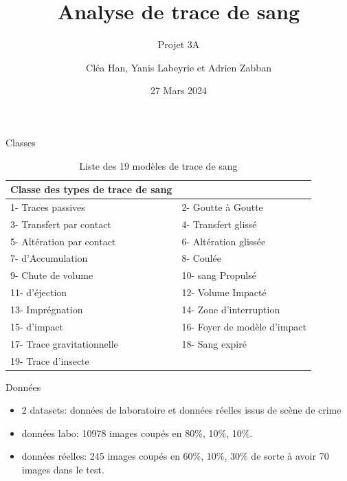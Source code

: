 \documentclass[11pt]{beamer}
\title{Analyse de trace de sang}
\subtitle{Projet 3A}
\author{Cléa Han, Yanis Labeyrie et Adrien Zabban}
\date{27 Mars 2024}
\begin{document}
\maketitle

\begin{frame}{Classes}
    \begin{table}[ht]
        \centering
        \begin{tabular}{|ll|}
            \hline
            \textbf{Classe des types de trace de sang} &  \\
            \hline
            1- Traces passives & 2- Goutte à Goutte \\
            3- Transfert par contact & 4- Transfert glissé \\
            5- Altération par contact & 6- Altération glissée \\
            7- d'Accumulation & 8- Coulée \\
            9- Chute de volume & 10- sang Propulsé \\
            11- d'éjection & 12- Volume Impacté \\
            13- Imprégnation & 14- Zone d'interruption \\
            15- d'impact & 16- Foyer de modèle d'impact \\
            17- Trace gravitationnelle & 18- Sang expiré \\
            19- Trace d'insecte & \\
            \hline
        \end{tabular}
        \caption{Liste des 19 modèles de trace de sang}
        \label{tab:classes}
    \end{table}
\end{frame}

\begin{frame}{Données}
    \begin{itemize}
        \item 2 datasets: données de laboratoire et données réelles issus de scène de crime
        \item données labo: 10978 images coupés en 80\%, 10\%, 10\%.
        \item données réelles: 245 images coupés en 60\%, 10\%, 30\% de sorte à avoir 70 images dans le test.
    \end{itemize}
\end{frame}
\end{document}
